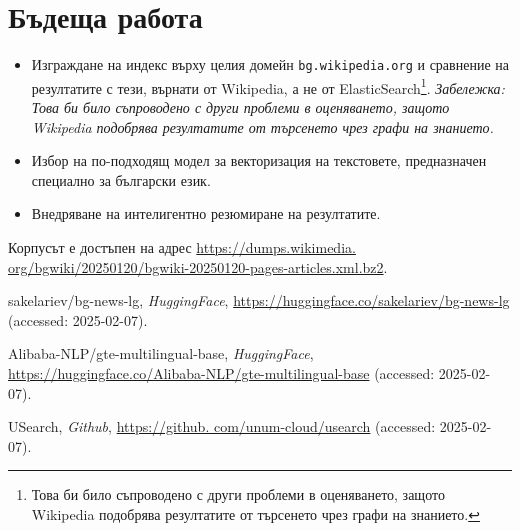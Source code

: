 \documentclass[a4paper,12pt]{article} \usepackage[utf8]{inputenc}
\begin{document}
\section{Бъдеща работа} \begin{itemize} \item Изграждане на индекс върху целия
домейн \texttt{bg.wikipedia.org} и сравнение на резултатите с тези, върнати от
Wikipedia, а не от ElasticSearch\footnote{Това би било съпроводено с други
проблеми в оценяването, защото Wikipedia подобрява резултатите от търсенето чрез
графи на знанието.}. \textit{Забележка: Това би било съпроводено с други
проблеми в оценяването, защото Wikipedia подобрява резултатите от търсенето чрез
графи на знанието.} \item Избор на по-подходящ модел за векторизация на
текстовете, предназначен специално за български език. \item Внедряване на
интелигентно резюмиране на резултатите. \end{itemize} \begin{thebibliography}{9}
 Корпусът е достъпен на адрес \url{https://dumps.wikimedia.
org/bgwiki/20250120/bgwiki-20250120-pages-articles.xml.bz2}.

 sakelariev/bg-news-lg, \textit{HuggingFace},
\url{https://huggingface.co/sakelariev/bg-news-lg} (accessed: 2025-02-07).

 Alibaba-NLP/gte-multilingual-base, \textit{HuggingFace},
\url{https://huggingface.co/Alibaba-NLP/gte-multilingual-base} (accessed:
2025-02-07).

 USearch, \textit{Github}, \url{https://github.
com/unum-cloud/usearch} (accessed: 2025-02-07). \end{thebibliography}
\end{document}

